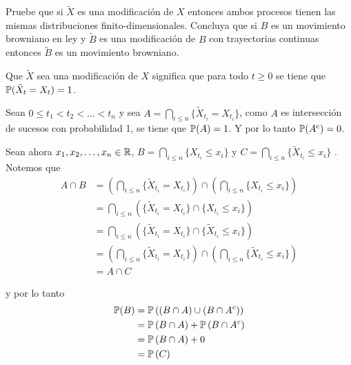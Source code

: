 \begin{problema}
	Pruebe que si $\tilde X$ es una modificaci\'on de $X$ entonces ambos procesos 
	tienen las mismas distribuciones finito-dimensionales. Concluya que si $B$ es 
	un movimiento browniano en ley y $\tilde B$ es una modificaci\'on de $B$ con 
	trayectorias continuas entonces $\tilde B$ es un movimiento browniano. 
\end{problema}

\afterstatement\pn

Que $\tilde X$ sea una modificaci\'on de $X$ significa que para todo $t\geq 0$
se tiene que $\P(\tilde X_t = X_t) = 1$.\pn

Sean $0 \leq t_1 < t_2 < \dots < t_n$ y sea $A = \bigcap_{i \leq n} \{ \tilde X_{t_i} = X_{t_i} \}$,
como $A$ es intersección de sucesos con probabilidad 1, se tiene que $\P(A) = 1$. Y por lo tanto $\P(A^c) = 0$.\pn

Sean ahora $x_1, x_2, \dots, x_n \in \R$, $B = \bigcap_{i \leq n} \{ X_{t_i} \leq x_i \}$ y $C = \bigcap_{i \leq n} \{\tilde X_{t_i} \leq x_i \}$ . Notemos
que
\begin{align}
        A \cap B    &=  \left( \bigcap_{i \leq n} \{ \tilde X_{t_i} = X_{t_i} \} \right) \cap \left( \bigcap_{i \leq n} \{ X_{t_i} \leq x_i \} \right)          \\
                    &=  \bigcap_{i \leq n} \left( \{ \tilde X_{t_i} = X_{t_i} \} \cap \{ X_{t_i} \leq x_i \} \right)                                            \\
                    &=  \bigcap_{i \leq n} \left( \{ \tilde X_{t_i} = X_{t_i} \} \cap \{ \tilde X_{t_i} \leq x_i \} \right)                                     \\
                    &=  \left( \bigcap_{i \leq n} \{ \tilde X_{t_i} = X_{t_i} \} \right) \cap \left( \bigcap_{i \leq n} \{ \tilde X_{t_i} \leq x_i \} \right)   \\
                    &=  A \cap C
\end{align} 

y por lo tanto
\begin{align}
    \P(B)   &=  \P\left( (B \cap A) \cup (B \cap A^c) \right)            \\
            &=  \P\left( B \cap A \right) + \P\left(B \cap A^c \right)   \\
            &=  \P\left( B \cap A \right) + 0                            \\
            &=  \P\left( C \right)                                       \\
\end{align}

